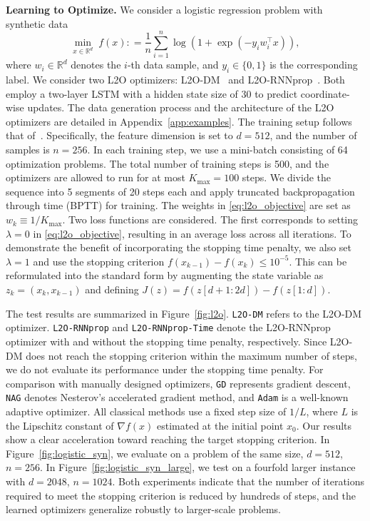 \documentclass{article}
\begin{document}
\textbf{Learning to Optimize.}
We consider a logistic regression problem with synthetic data
$$
\min_{x \in \mathbb{R}^d} \;f(x)\colon= \frac{1}{n} \sum_{i=1}^n \log\left(1 + \exp(-y_i w_i^\top x)\right),
$$
where $w_i \in \mathbb{R}^d$ denotes the $i$-th data sample, and $y_i \in \{0,1\}$ is the corresponding label. We consider two L2O optimizers: L2O-DM~\cite{l2o-dm} and L2O-RNNprop~\cite{rnnprop}. Both employ a two-layer LSTM with a hidden state size of 30 to predict coordinate-wise updates. The data generation process and the architecture of the L2O optimizers are detailed in Appendix~\ref{app:examples}. The training setup follows that of~\cite{rnnprop}. Specifically, the feature dimension is set to $d = 512$, and the number of samples is $n = 256$. In each training step, we use a mini-batch consisting of 64 optimization problems. The total number of training steps is 500, and the optimizers are allowed to run for at most $K_{\max} = 100$ steps. We divide the sequence into 5 segments of 20 steps each and apply truncated backpropagation through time (BPTT) for training. The weights in \eqref{eq:l2o_objective} are set as $w_k \equiv 1 / K_{\max}$. Two loss functions are considered. The first corresponds to setting $\lambda = 0$ in \eqref{eq:l2o_objective}, resulting in an average loss across all iterations. To demonstrate the benefit of incorporating the stopping time penalty, we also set $\lambda = 1$ and use the stopping criterion $f(x_{k-1}) - f(x_k) \leq 10^{-5}$. This can be reformulated into the standard form by augmenting the state variable as $z_k = (x_k, x_{k-1})$ and defining $J(z) = f(z[d+1:2d]) - f(z[1:d])$.

The test results are summarized in Figure~\ref{fig:l2o}. \texttt{L2O-DM} refers to the L2O-DM optimizer. \texttt{L2O-RNNprop} and \texttt{L2O-RNNprop-Time} denote the L2O-RNNprop optimizer with and without the stopping time penalty, respectively. Since L2O-DM does not reach the stopping criterion within the maximum number of steps, we do not evaluate its performance under the stopping time penalty. For comparison with manually designed optimizers, \texttt{GD} represents gradient descent, \texttt{NAG} denotes Nesterov's accelerated gradient method, and \texttt{Adam} is a well-known adaptive optimizer. All classical methods use a fixed step size of $1/L$, where $L$ is the Lipschitz constant of $\nabla f(x)$ estimated at the initial point $x_0$. Our results show a clear acceleration toward reaching the target stopping criterion. In Figure~\ref{fig:logistic_syn}, we evaluate on a problem of the same size, $d = 512$, $n = 256$. In Figure~\ref{fig:logistic_syn_large}, we test on a fourfold larger instance with $d = 2048$, $n = 1024$. Both experiments indicate that the number of iterations required to meet the stopping criterion is reduced by hundreds of steps, and the learned optimizers generalize robustly to larger-scale problems.
\end{document}
